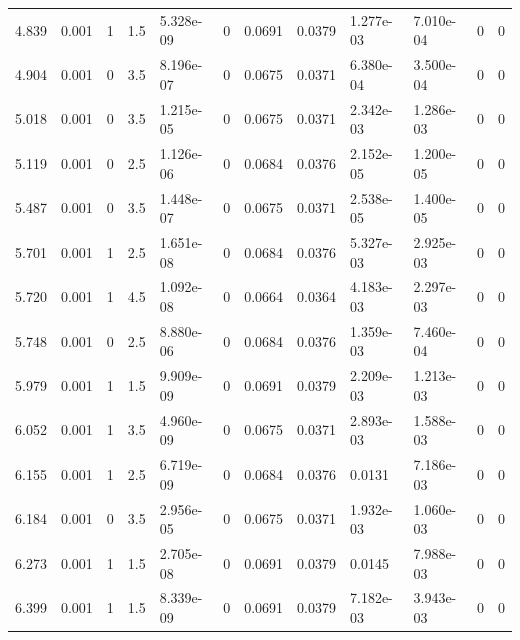 \documentclass[preview]{standalone}
\begin{document}
{{\begin{tabular}{L{1.2cm}C{1.2cm} C{0.3cm}C{0.5cm} C{1.4cm}C{1.4cm} C{1.4cm}C{1.4cm} C{1.6cm}C{1.6cm} C{1.6cm}C{1.6cm}}
  4.839  &  0.001  & 1     & 1.5 &  5.328e-09  & 0  &  0.0691&   0.0379& 1.277e-03 & 7.010e-04   &  0 & 0  \\ 
  4.904  &  0.001  & 0     & 3.5 &  8.196e-07  & 0  &  0.0675&   0.0371& 6.380e-04 & 3.500e-04   &  0 & 0  \\ 
  5.018  &  0.001  & 0     & 3.5 &  1.215e-05  & 0  &  0.0675&   0.0371& 2.342e-03 & 1.286e-03   &  0 & 0  \\ 
  5.119  &  0.001  & 0     & 2.5 &  1.126e-06  & 0  &  0.0684&   0.0376& 2.152e-05 & 1.200e-05   &  0 & 0  \\ 
  5.487  &  0.001  & 0     & 3.5 &  1.448e-07  & 0  &  0.0675&   0.0371& 2.538e-05 & 1.400e-05   &  0 & 0  \\ 
  5.701  &  0.001  & 1     & 2.5 &  1.651e-08  & 0  &  0.0684&   0.0376& 5.327e-03 & 2.925e-03   &  0 & 0  \\ 
  5.720  &  0.001  & 1     & 4.5 &  1.092e-08  & 0  &  0.0664&   0.0364& 4.183e-03 & 2.297e-03   &  0 & 0  \\ 
  5.748  &  0.001  & 0     & 2.5 &  8.880e-06  & 0  &  0.0684&   0.0376& 1.359e-03 & 7.460e-04   &  0 & 0  \\ 
  5.979  &  0.001  & 1     & 1.5 &  9.909e-09  & 0  &  0.0691&   0.0379& 2.209e-03 & 1.213e-03   &  0 & 0  \\ 
  6.052  &  0.001  & 1     & 3.5 &  4.960e-09  & 0  &  0.0675&   0.0371& 2.893e-03 & 1.588e-03   &  0 & 0  \\ 
  6.155  &  0.001  & 1     & 2.5 &  6.719e-09  & 0  &  0.0684&   0.0376& 0.0131 & 7.186e-03   &  0 & 0  \\ 
  6.184  &  0.001  & 0     & 3.5 &  2.956e-05  & 0  &  0.0675&   0.0371& 1.932e-03 & 1.060e-03   &  0 & 0  \\ 
  6.273  &  0.001  & 1     & 1.5 &  2.705e-08  & 0  &  0.0691&   0.0379& 0.0145 & 7.988e-03   &  0 & 0  \\ 
  6.399  &  0.001  & 1     & 1.5 &  8.339e-09  & 0  &  0.0691&   0.0379& 7.182e-03 & 3.943e-03   &  0 & 0  \\ 
\hline 
\end{tabular} 

}}
\end{document}
